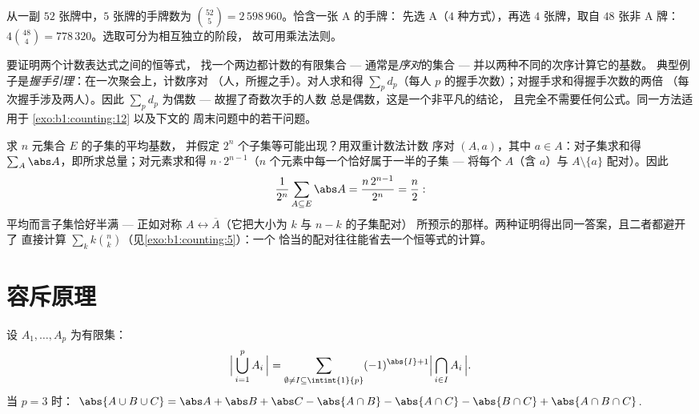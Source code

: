 \begin{example}[扑克式计数]\label{ex:b1:counting:poker}
从一副 $52$ 张牌中，$5$ 张牌的手牌数为
$\binom{52}{5} = 2\,598\,960$。恰含一张 A 的手牌：
先选 A（$4$ 种方式），再选 $4$ 张牌，取自 $48$ 张非 A 牌：
$4 \binom{48}{4} = 778\,320$。选取可分为相互独立的阶段，
故可用乘法法则。
\end{example}

\begin{method}[双重计数]\label{met:b1:counting:doublecount}
要证明两个计数表达式之间的恒等式，
找一个两边都计数的有限集合 --- 通常是\emph{序对}的集合 ---
并以两种不同的次序计算它的基数。
典型例子是\emph{握手引理}：在一次聚会上，计数序对
（人，所握之手）。对人求和得 $\sum_p d_p$（每人
$p$ 的握手次数）；对握手求和得握手次数的两倍
（每次握手涉及两人）。因此
$\sum_p d_p$ 为偶数 --- 故握了奇数次手的人数
总是偶数，这是一个非平凡的结论，
且完全不需要任何公式。同一方法适用于
\cref{exo:b1:counting:12} 以及下文的
周末问题中的若干问题。
\end{method}

\begin{example}[平均子集]\label{ex:b1:counting:averagesubset}
求 $n$ 元集合 $E$ 的子集的平均基数，
并假定 $2^n$ 个子集等可能出现？用双重计数法计数
序对 $(A, a)$，其中 $a \in A$：对子集求和得
$\sum_A \abs A$，即所求总量；对元素求和得
$n \cdot 2^{n-1}$（$n$ 个元素中每一个恰好属于一半的子集
--- 将每个 $A$（含 $a$）与 $A
\setminus \{a\}$ 配对）。因此
\[
\frac{1}{2^n}\sum_{A \subseteq E} \abs A
= \frac{n\,2^{n-1}}{2^n} = \frac n2 :
\]
平均而言子集恰好半满 --- 正如对称 $A
\leftrightarrow \overline A$（它把大小为 $k$ 与 $n - k$ 的子集配对）
所预示的那样。两种证明得出同一答案，且二者都避开了
直接计算 $\sum_k k\binom nk$（见\cref{exo:b1:counting:5}）：一个
恰当的配对往往能省去一个恒等式的计算。
\end{example}

\section{容斥原理}

\begin{theorem}[容斥原理]\label{thm:b1:counting:inclexcl}
设 $A_1, \dots, A_p$ 为有限集：
\[
\Bigl|\, \bigcup_{i=1}^{p} A_i \,\Bigr|
= \sum_{\emptyset \neq I \subseteq \intint{1}{p}}
(-1)^{\abs{I}+1} \Bigl|\, \bigcap_{i \in I} A_i \,\Bigr| .
\]
当 $p = 3$ 时：
$\abs{A \cup B \cup C} = \abs A + \abs B + \abs C - \abs{A \cap B} -
\abs{A \cap C} - \abs{B \cap C} + \abs{A \cap B \cap C}$.
\end{theorem}

